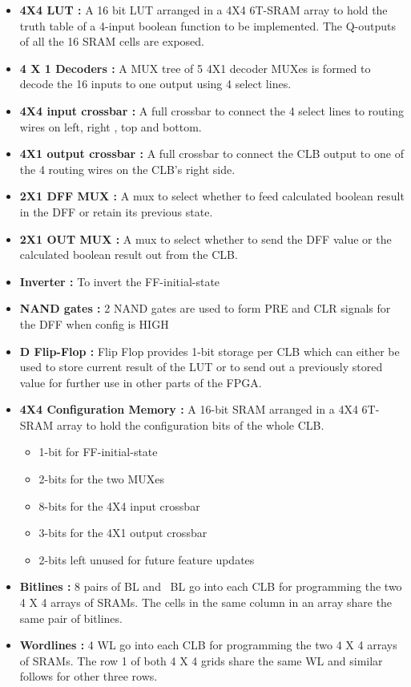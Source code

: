 \begin{itemize}
\item \textbf{4X4 LUT :} A 16 bit LUT arranged in a 4X4 6T-SRAM array to hold the truth table of a 4-input boolean function to be implemented. The Q-outputs of all the 16 SRAM cells are exposed. 
\item \textbf{4 X 1 Decoders :} A MUX tree of 5 4X1 decoder MUXes is formed to decode the 16 inputs to one output using 4 select lines.
\item \textbf{4X4 input crossbar :} A full crossbar to connect the 4 select lines to routing wires on left, right , top and bottom.
\item \textbf{4X1 output crossbar :} A full crossbar to connect the CLB output to one of the 4 routing wires on the CLB's right side.
\item \textbf{2X1 DFF MUX :} A mux to select whether to feed calculated boolean result in the DFF or retain its previous state.
\item \textbf{2X1 OUT MUX :} A mux to select whether to send the DFF value or the calculated boolean result out from the CLB.
\item \textbf{Inverter :} To invert the FF-initial-state
\item \textbf{NAND gates :} 2 NAND gates are used to form PRE and CLR signals for the DFF when config is HIGH
\item \textbf{D Flip-Flop :} Flip Flop provides 1-bit storage per CLB which can either be used to store current result of the LUT or to send out a previously stored value for further use in other parts of the FPGA.
\item \textbf{4X4 Configuration Memory :} A 16-bit SRAM arranged in a 4X4 6T-SRAM array to hold the configuration bits of the whole CLB. 
\begin{itemize}
\item 1-bit for FF-initial-state
\item 2-bits for the two MUXes
\item 8-bits for the 4X4 input crossbar
\item 3-bits for the 4X1 output crossbar
\item 2-bits left unused for future feature updates
\end{itemize}
\item \textbf{Bitlines :} 8 pairs of BL and ~BL go into each CLB for programming the two 4 X 4 arrays of SRAMs. The cells in the same column in an array share the same pair of bitlines.
\item \textbf{Wordlines :} 4 WL go into each CLB for programming the two 4 X 4 arrays of SRAMs. The row 1 of both 4 X 4 grids share the same WL and similar follows for other three rows.
\end{itemize}

